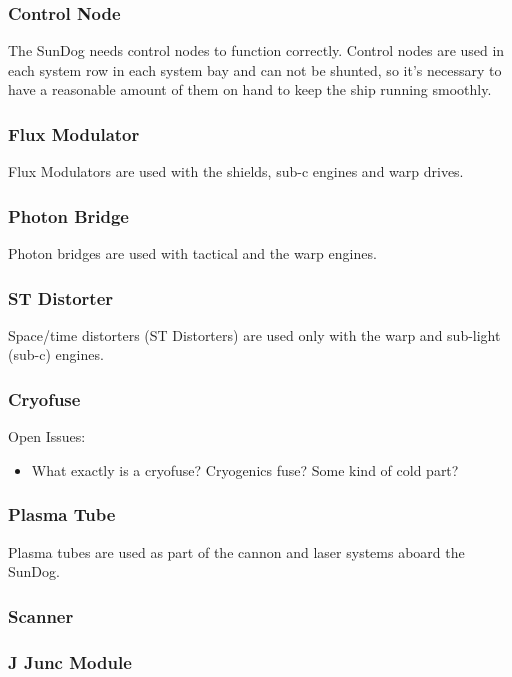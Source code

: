 \subsubsection{Control Node}
The SunDog needs control nodes to function correctly.  Control nodes are
used in each system row in each system bay and can not be shunted, so it's
necessary to have a reasonable amount of them on hand to keep the ship
running smoothly.  

\subsubsection{Flux Modulator}
Flux Modulators are used with the shields, sub-c engines and warp drives.

\subsubsection{Photon Bridge}
Photon bridges are used with tactical and the warp engines.

\subsubsection{ST Distorter}
Space/time distorters (ST Distorters) are used only with the warp and
sub-light (sub-c) engines.

\subsubsection{Cryofuse}

Open Issues:
\begin{itemize}
\item What exactly is a cryofuse?  Cryogenics fuse?  Some kind of cold part?
\end{itemize}

\subsubsection{Plasma Tube}

Plasma tubes are used as part of the cannon and laser systems aboard the
SunDog.

\subsubsection{Scanner}
\subsubsection{J Junc Module}

